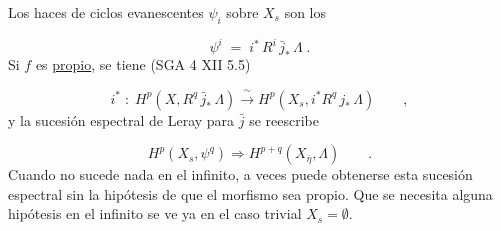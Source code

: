 \begin{center}
\end{center}
Los haces de ciclos evanescentes $\psi_i$ sobre $X_s$ son los

\begin{equation*}\tag{2.2.1}
\psi^i \;=\; i^{*}\, R^i\, \bar{j}_{*}\, \Lambda \;.
\end{equation*}
Si $f$ es \underline{propio}, se tiene (SGA 4 XII 5.5)

\begin{equation*}\tag{2.2.2}
i^{*} \;:\; H^p(X,R^q\,\bar{j}_{*}\,\Lambda) \xrightarrow{\ \sim\ } H^p(X_s,i^{*}R^q\,j_{*}\,\Lambda) \qquad ,
\end{equation*}
y la sucesión espectral de Leray para $\bar{j}$ se reescribe

\begin{equation*}\tag{2.2.3}
H^p(X_s,\psi^q) \Longrightarrow H^{p+q}(X_{\bar{\eta}},\Lambda) \qquad .
\end{equation*}
Cuando no sucede nada en el infinito, a veces puede obtenerse esta sucesión espectral sin la hipótesis de que el morfismo sea propio. Que se necesita alguna hipótesis en el infinito se ve ya en el caso trivial $X_s = \emptyset$.

